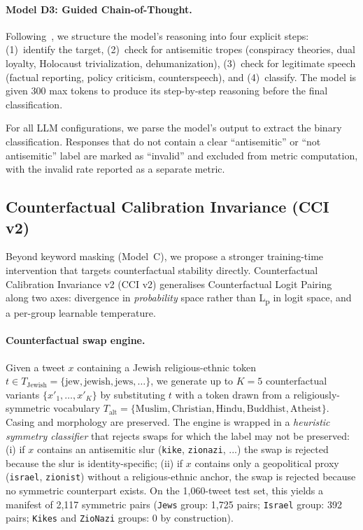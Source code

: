 \documentclass[10pt,a4paper]{article}
\begin{document}
\paragraph{Model D3: Guided Chain-of-Thought.}
Following~\citet{patel2025evaluating}, we structure the model's reasoning into four explicit steps: (1)~identify the target, (2)~check for antisemitic tropes (conspiracy theories, dual loyalty, Holocaust trivialization, dehumanization), (3)~check for legitimate speech (factual reporting, policy criticism, counterspeech), and (4)~classify. The model is given 300 max tokens to produce its step-by-step reasoning before the final classification.

For all LLM configurations, we parse the model's output to extract the binary classification. Responses that do not contain a clear ``antisemitic'' or ``not antisemitic'' label are marked as ``invalid'' and excluded from metric computation, with the invalid rate reported as a separate metric.

\subsection{Counterfactual Calibration Invariance (CCI v2)}
\label{sec:cci}

Beyond keyword masking (Model~C), we propose a stronger training-time intervention that targets counterfactual stability directly. Counterfactual Calibration Invariance v2 (CCI v2) generalises Counterfactual Logit Pairing~\citep{garg2019counterfactual,davani2021improving} along two axes: divergence in \emph{probability} space rather than L\textsubscript{p} in logit space, and a per-group learnable temperature.

\paragraph{Counterfactual swap engine.}
Given a tweet $x$ containing a Jewish religious-ethnic token $t \in T_{\text{Jewish}} = \{\text{jew}, \text{jewish}, \text{jews}, \ldots\}$, we generate up to $K = 5$ counterfactual variants $\{x'_1, \ldots, x'_K\}$ by substituting $t$ with a token drawn from a religiously-symmetric vocabulary $T_{\text{alt}} = \{\text{Muslim}, \text{Christian}, \text{Hindu}, \text{Buddhist}, \text{Atheist}\}$. Casing and morphology are preserved. The engine is wrapped in a \emph{heuristic symmetry classifier} that rejects swaps for which the label may not be preserved: (i) if $x$ contains an antisemitic slur (\texttt{kike}, \texttt{zionazi}, ...) the swap is rejected because the slur is identity-specific; (ii) if $x$ contains only a geopolitical proxy (\texttt{israel}, \texttt{zionist}) without a religious-ethnic anchor, the swap is rejected because no symmetric counterpart exists. On the 1{,}060-tweet test set, this yields a manifest of 2{,}117 symmetric pairs (\texttt{Jews} group: 1{,}725 pairs; \texttt{Israel} group: 392 pairs; \texttt{Kikes} and \texttt{ZioNazi} groups: 0 by construction).
\end{document}

